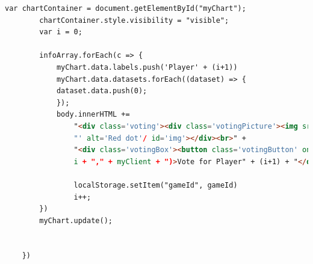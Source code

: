 \begin{lstlisting}[language=html,caption=Start Voting]
        var chartContainer = document.getElementById("myChart");
        chartContainer.style.visibility = "visible";
        var i = 0;
                    
        infoArray.forEach(c => {
            myChart.data.labels.push('Player' + (i+1))
            myChart.data.datasets.forEach((dataset) => {
            dataset.data.push(0);
            });
            body.innerHTML += 
                "<div class='voting'><div class='votingPicture'><img src='data:image/png;base64," + game.clients[i].img +
                "' alt='Red dot'/ id='img'></div><br>" + 
                "<div class='votingBox'><button class='votingButton' onclick=voted(" +
                i + "," + myClient + ")>Vote for Player" + (i+1) + "</div></div>";

                localStorage.setItem("gameId", gameId)
                i++;
        })
        myChart.update();


    })
\end{lstlisting}

